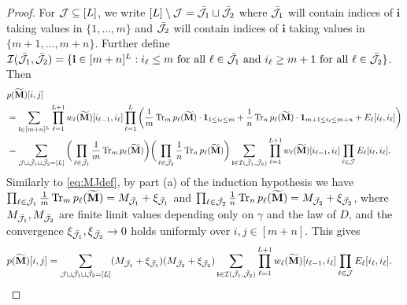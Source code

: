 \documentclass[10pt,reqno]{amsart}
\def\1{\mathbf{1}}
\def\bi{\mathbf{i}}
\def\Tr{\operatorname{Tr}}
\begin{document}
\begin{proof}
For $\mathcal{J}\subseteq[L]$, we write $[L]\setminus\mathcal{J}=\bar{\mathcal{J}}_1 \sqcup \bar{\mathcal{J}}_2$
where $\bar{\mathcal{J}}_1$ will contain indices of $\bi$ taking values in
$\{1,\ldots,m\}$ and 
$\bar{\mathcal{J}}_2$ will contain indices of $\bi$ taking values in $\{m+1,\ldots,m+n\}$.
Further define $\cI(\bar\cJ_1,\bar\cJ_2)=\{\bi\in[m+n]^L: i_\ell
\leq m \text{ for all } \ell \in \bar\cJ_1 \text{ and } i_\ell \geq
m+1 \text{ for all } \ell \in \bar\cJ_2\}$.
Then 
\begin{align*}
	&p(\widetilde\bM)[i,j]\\
&= \sum_{\bi\in[m+n]^L} 
	\prod_{\ell=1}^{L+1} w_\ell(\widetilde \bM)[i_{\ell-1},i_{\ell}]
	\prod_{\ell=1}^L \bigg(\frac{1}{m}\Tr_m p_\ell(\widetilde{\bM}) \cdot
\1_{1\leq i_\ell\leq m}
	+ \frac{1}{n}\Tr_n p_\ell(\widetilde{\bM}) \cdot
\1_{m+1\leq i_\ell\leq m+n}
	+ E_\ell[i_{\ell}, i_{\ell}]\bigg)\\
	&= \sum_{\cJ \sqcup \bar\cJ_1 \sqcup \bar\cJ_2=[L]}
	\bigg(\prod_{\ell\in\bar\cJ_1} \frac{1}{m}\Tr_m p_\ell(\widetilde\bM)\bigg)
	\bigg(\prod_{\ell\in\bar\cJ_2} \frac{1}{n} \Tr_n p_\ell(\widetilde\bM)\bigg)
	\sum_{\bi\in\cI(\bar\cJ_1,\bar\cJ_2)} \prod_{\ell=1}^{L+1}
	w_\ell(\widetilde \bM)[i_{\ell-1},i_\ell] \prod_{\ell \in \cJ} E_\ell[i_\ell,i_\ell].
\end{align*}
Similarly to \eqref{eq:MJdef}, by part (a) of the induction hypothesis
we have $\prod_{\ell\in\bar\cJ_1} \frac{1}{m}
\Tr_m p_\ell(\widetilde\bM) = M_{\bar\cJ_1} + \xi_{\bar\cJ_1}$ and 
$\prod_{\ell\in\bar\cJ_2} \frac{1}{n}
\Tr_n p_\ell(\widetilde\bM) = M_{\bar\cJ_2} + \xi_{\bar\cJ_2}$, where 
$M_{\bar{\mathcal{J}}_1}, M_{\bar{\mathcal{J}}_2}$ are finite limit values depending only on $\gamma$
and the law of $D$, and the convergence
$\xi_{\bar{\mathcal{J}}_1},\xi_{\bar{\mathcal{J}}_2} \to 0$ holds uniformly over
$i,j \in [m+n]$.
This gives
\begin{align}\label{eq:rec_pm}
	p(\widetilde\bM)[i,j] &= \sum_{\cJ \sqcup \bar\cJ_1\sqcup\bar\cJ_2=[L]}
	(M_{\bar\cJ_1} + \xi_{\bar\cJ_1}) (M_{\bar\cJ_2} + \xi_{\bar\cJ_2})
	\sum_{\bi\in\cI(\bar\cJ_1,\bar\cJ_2)} \prod_{\ell=1}^{L+1}
	w_\ell(\widetilde \bM)[i_{\ell-1},i_\ell] \prod_{\ell \in \cJ} E_\ell[i_\ell,i_\ell].
\end{align}


\end{proof}
\end{document}
